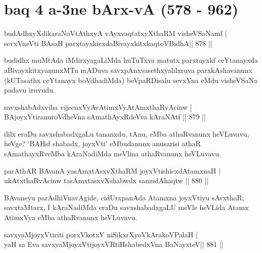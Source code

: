 \section*{baq 4 a-3ne bArx-vA (578 - 962)}


\begin{shl}
budAdhxyXdikaraNoVtAthxyA vAyxvaqtatxyXthaRM visheVSaNamf | \\
sevxVneVti BAsaH parxtayxkicxdaBivayxkitxkaqtoV\s BidhA\hfill ||  878 ||  
\end{shl}

\begin{artha}
budidhx muMtAda iMdirxyagaLiMda huTuTxva matutx parxtayxkf ceYtanayxda aBivayxkitxyanunxMTu mADuva savxpAnxvasethxyalilxruva parxkAshavanunx (kUTasathx ceYtanayx boVdhadiMda) beVpaRDisalu sevxVna eMdu visheVSaNa padavu iruvudu.
\end{artha}

\begin{shl}
savxshabAdxviha vijecnxVyAvAtimxVyAtAmxthaRvAcinw | \\
BAjoyxVtiranuroVdheVna sAmathAyxRdeVva kAraNAtf \hfill||  879 ||  
\end{shl}

\begin{artha}
ililx eraDu savxshabadxgaLu tananxdu, tAnu, eMba athaRvanunx heVLuvavu, heVge? `BAHsf shabadx, joyxVti' eMbudanunx anusarisi athaR sAmathayxRveMba kAraNadiMda meVlina athaRvanunx heVLuvavu.
\end{artha}

\begin{shl}
parAthAR BAvanA yasAmxtAsxvXthaRM joyxVtishicxdAtamxnaH | \\
ukAtxthaRvAcinw tasAmxtasxvXshabwdx samudAhaqtw \hfill||  880 ||  
\end{shl}

\begin{artha}
BAvaneyu parAdhiVnavAgide, cidUrxpanAda Atamxna joyxVtiyu sAvxthaR; savxtaMtarx, I kAraNadiMda eraDu savxshabadxgaLU meVle heVLida Atamx AtimxVya eMba athaRvanunx heVLuvavu.
\end{artha}


\begin{shl}
savxyaMjoyxVtiriti porxVkotxV niSikxrXyoV\s kArakoV\s PalaH | \\
yaH sa Eva savxyaMjoyxVtijoyxVRtiHshabedxVna BaNayxteV\hfill ||  881 ||  
\end{shl}

